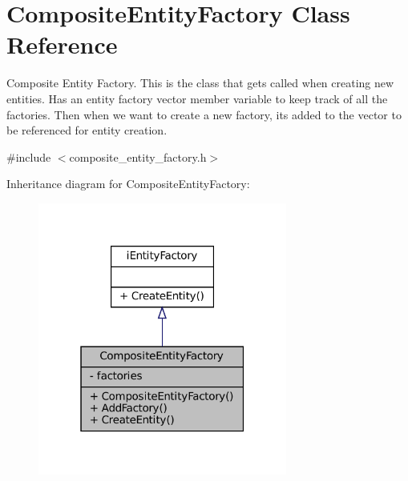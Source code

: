 \hypertarget{classCompositeEntityFactory}{}\section{Composite\+Entity\+Factory Class Reference}
\label{classCompositeEntityFactory}


Composite Entity Factory. This is the class that get\textquotesingle{}s called when creating new entities. Has an entity factory vector member variable to keep track of all the factories. Then when we want to create a new factory, it\textquotesingle{}s added to the vector to be referenced for entity creation.  




{\ttfamily \#include $<$composite\+\_\+entity\+\_\+factory.\+h$>$}



Inheritance diagram for Composite\+Entity\+Factory\+:\nopagebreak
\begin{figure}[H]
\begin{center}
\leavevmode
\includegraphics[width=232pt]{classCompositeEntityFactory__inherit__graph}
\end{center}
\end{figure}


